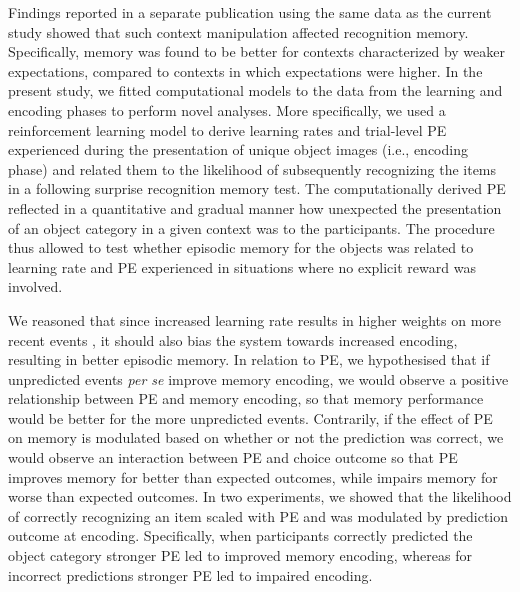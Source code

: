 \documentclass[a4paper,12pt]{article}
\begin{document}
Findings reported in a separate publication using the same data as the current study \citep{ortiz2021not} showed that such context manipulation affected recognition memory. Specifically, memory was found to be better for contexts characterized by weaker expectations, compared to contexts in which expectations were higher. In the present study, we fitted computational models to the data from the learning and encoding phases to perform novel analyses. More specifically, we used a reinforcement learning model to derive learning rates and trial-level PE experienced during the presentation of unique object images (i.e., encoding phase) and related them to the likelihood of subsequently recognizing the items in a following surprise recognition memory test. The computationally derived PE reflected in a quantitative and gradual manner how unexpected the presentation of an object category in a given context was to the participants. The procedure thus allowed to test whether episodic memory for the objects was related to learning rate and PE experienced in situations where no explicit reward was involved.
\par
 We reasoned that since increased learning rate results in higher weights on more recent events \citep{Daw2013}, it should also bias the system towards increased encoding, resulting in better episodic memory. In relation to PE, we hypothesised that if unpredicted events \textit{per se} improve memory encoding, we would observe a positive relationship between PE and memory encoding, so that memory performance would be better for the more unpredicted events. Contrarily, if the effect of PE on memory is modulated based on whether or not the prediction was correct, we would observe an interaction between PE and choice outcome so that PE improves memory for better than expected outcomes, while impairs memory for worse than expected outcomes. In two experiments, we showed that the likelihood of correctly recognizing an item scaled with PE and was modulated by prediction outcome at encoding. Specifically, when participants correctly predicted the object category stronger PE led to improved memory encoding, whereas for incorrect predictions stronger PE led to impaired encoding. %
\end{document}
